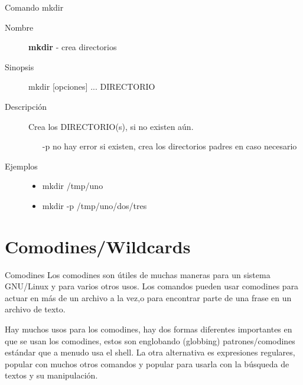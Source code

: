 \begin{frame}[c]{Comando mkdir}
  \begin{description}
    \item[Nombre]
      \textbf{mkdir} - crea directorios

    \vspace{\baselineskip}
    \item[Sinopsis]
      mkdir [opciones] ... DIRECTORIO

    \vspace{\baselineskip}
    \item[Descripción]
      Crea los DIRECTORIO(s), si no existen aún.

      \begin{itemize}
        \item [-p] no hay error si existen, crea los directorios
          padres en caso necesario
      \end{itemize}

    \vspace{\baselineskip}
    \item[Ejemplos]
      \begin{itemize}
        \item mkdir /tmp/uno
        \item mkdir -p /tmp/uno/dos/tres
      \end{itemize}
  \end{description}
\end{frame}

\section{Comodines/Wildcards}

\begin{frame}[c]{Comodines}
  Los comodines son útiles de muchas maneras para un sistema GNU/Linux y
  para varios otros usos. Los comandos pueden usar comodines para actuar
  en más de un archivo a la vez,o para encontrar parte de una frase en un
  archivo de texto.

  \vspace{\baselineskip}
  Hay muchos usos para los comodines, hay dos formas diferentes importantes
  en que se usan los comodines, estos son englobando (globbing)
  patrones/comodines estándar que a menudo usa el shell. La otra
  alternativa es expresiones regulares, popular con muchos otros comandos y
  popular para usarla con la búsqueda de textos y su manipulación.
\end{frame}

